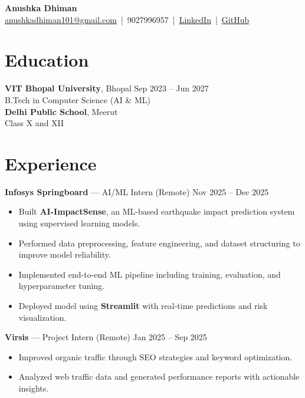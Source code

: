\documentclass[10.5pt]{article}
\begin{document}
\begin{center}
    {\Large \textbf{Anushka Dhiman}} \\[4pt]
    \href{mailto:anushkadhiman101@gmail.com}{anushkadhiman101@gmail.com} \,|\, 
    9027996957 \,|\, 
    \href{https://www.linkedin.com/in/anushka-dhiman-7b306027b/}{LinkedIn} \,|\, 
    \href{https://github.com/anushkaaa26}{GitHub}
\end{center}

\section*{Education}
\textbf{VIT Bhopal University}, Bhopal \hfill Sep 2023 -- Jun 2027 \\
B.Tech in Computer Science (AI \& ML) \\
\textbf{Delhi Public School}, Meerut \\
Class X and XII

\section*{Experience}

\textbf{Infosys Springboard} — AI/ML Intern (Remote) \hfill Nov 2025 -- Dec 2025
\begin{itemize}
    \item Built \textbf{AI-ImpactSense}, an ML-based earthquake impact prediction system using supervised learning models.
    \item Performed data preprocessing, feature engineering, and dataset structuring to improve model reliability.
    \item Implemented end-to-end ML pipeline including training, evaluation, and hyperparameter tuning.
    \item Deployed model using \textbf{Streamlit} with real-time predictions and risk visualization.
\end{itemize}

\textbf{Virsis} — Project Intern (Remote) \hfill Jan 2025 -- Sep 2025
\begin{itemize}
    \item Improved organic traffic through SEO strategies and keyword optimization.
    \item Analyzed web traffic data and generated performance reports with actionable insights.
\end{itemize}
\end{document}
